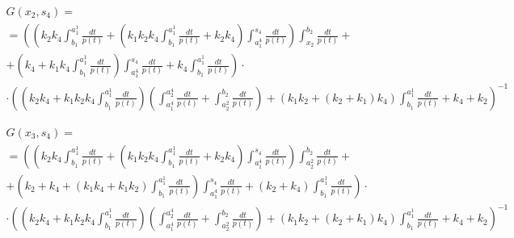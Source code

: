 \documentclass[a4paper,12pt]{article} %
\begin{document}
\begin{multline}
	G(x_2,s_4)=\\=
	\left(
		\left( k_2 k_4 \int_{b_1}^{a_1^1}\frac{dt}{p(t)}+
		\left( k_1 k_2 k_4 \int_{b_1}^{a_1^1}\frac{dt}{p(t)}+
		k_2 k_4\right)  \int_{a_1^4}^{s_4}\frac{dt}{p(t)}\right)  \int_{x_2}^{b_2}\frac{dt}{p(t)}
		\right. + \\ + \left.
		\left( k_4+k_1 k_4 \int_{b_1}^{a_1^1}\frac{dt}{p(t)}\right)  \int_{a_1^4}^{s_4}\frac{dt}{p(t)}+k_4 \int_{b_1}^{a_1^1}\frac{dt}{p(t)}
	\right) \cdot \\ \cdot \left(
		\left( k_2 k_4+k_1 k_2 k_4 \int_{b_1}^{a_1^1}\frac{dt}{p(t)}\right)
		\left( \int_{a_1^4}^{a_2^4}\frac{dt}{p(t)}+ \int_{a_2^2}^{b_2}\frac{dt}{p(t)} \right)+
		\left( k_1 k_2+\left( k_2+k_1\right)  k_4\right)  \int_{b_1}^{a_1^1}\frac{dt}{p(t)}+k_4+k_2
	\right)^{-1}
\end{multline}

\begin{multline}
	G(x_3,s_4)=\\=
	\left(
		\left( k_2 k_4 \int_{b_1}^{a_1^1}\frac{dt}{p(t)}+
		\left( k_1 k_2 k_4 \int_{b_1}^{a_1^1}\frac{dt}{p(t)}+
		k_2 k_4\right)  \int_{a_1^4}^{s_4}\frac{dt}{p(t)}\right)  \int_{a_2^2}^{b_2}\frac{dt}{p(t)}
		\right. + \\ + \left.
		\left( k_2+k_4+\left( k_1 k_4+k_1 k_2\right)  \int_{b_1}^{a_1^1}\frac{dt}{p(t)}\right)  \int_{a_1^4}^{s_4}\frac{dt}{p(t)}+\left( k_2+k_4\right)  \int_{b_1}^{a_1^1}\frac{dt}{p(t)}
	\right) \cdot \\ \cdot \left(
		\left( k_2 k_4+k_1 k_2 k_4 \int_{b_1}^{a_1^1}\frac{dt}{p(t)}\right)
		\left( \int_{a_1^4}^{a_2^4}\frac{dt}{p(t)}+ \int_{a_2^2}^{b_2}\frac{dt}{p(t)} \right)+
		\left( k_1 k_2+\left( k_2+k_1\right)  k_4\right)  \int_{b_1}^{a_1^1}\frac{dt}{p(t)}+k_4+k_2
	\right)^{-1}
\end{multline}
\end{document}
